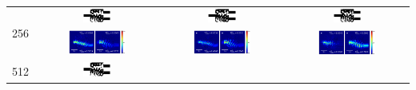 \begin{landscape}
\begin{table}[ht]
\begin{tabular}{|c|c|c|c|}
    \hline
      \multirow{2}{*}{256} &
      \includegraphics[width=0.24\textwidth]{image/results/wdm/CMA-ES/visualize_eps_cont_256.png} &
      \includegraphics[width=0.24\textwidth]{image/results/wdm/CMA-ES/visualize_eps_disc_256.png} &
      \includegraphics[width=0.24\textwidth]{image/results/wdm/CMA-ES/visualize_eps_fab_256.png} \\
      \cline{2-4}
      &
      \includegraphics[width=0.50\textwidth]{image/results/wdm/CMA-ES/visualize_field_cont_256.png} &
      \includegraphics[width=0.50\textwidth]{image/results/wdm/CMA-ES/visualize_field_disc_256.png} &
      \includegraphics[width=0.50\textwidth]{image/results/wdm/CMA-ES/visualize_field_fab_256.png} \\
    \hline
      \multirow{2}{*}{512} &
      \includegraphics[width=0.24\textwidth]{image/results/wdm/CMA-ES/visualize_eps_cont_512.png} &

\end{tabular}
\end{table}
\end{landscape}
